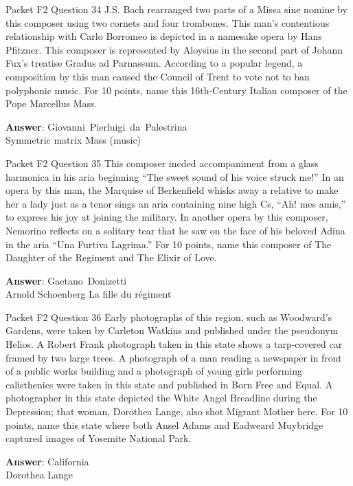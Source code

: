 \begin{frame}{Packet F2 Question 34}
J.S.   Bach rearranged two parts of a Missa sine nomine by this   composer using two cornets and four trombones. This man’s contentious relationship with Carlo Borromeo is depicted in a namesake opera by Hans Pfitzner. This composer   is represented   by Aloysius in the second part of Johann Fux’s treatise Gradus   ad Parnassum. According to a popular legend, a composition by this man caused the Council of Trent   to vote not to ban polyphonic music. For 10 points, name this 16th-Century Italian composer of the Pope Marcellus Mass.

\textbf{Answer}: Giovanni\ Pierluigi\ da\ Palestrina\\
 Symmetric matrix
 Mass (music)
\end{frame}

\begin{frame}{Packet F2 Question 35}
This composer incded accompaniment from a   glass harmonica in his aria beginning “The sweet sound of his voice struck me!” In an opera by this man, the Marquise of Berkenfield whisks   away a relative to make her a lady just as a tenor sings an aria containing nine high Cs, “Ah! mes amis,” to express his   joy at joining the military. In another opera by this composer, Nemorino reflects     on a solitary tear that he saw on the face of his beloved Adina in the aria “Una   Furtiva Lagrima.” For 10 points, name this composer of The Daughter of the Regiment and The Elixir of Love.

\textbf{Answer}: Gaetano\ Donizetti\\
 Arnold Schoenberg
 La fille du régiment
\end{frame}

\begin{frame}{Packet F2 Question 36}
Early photographs of this region, such as Woodward's Gardens, were taken by Carleton Watkins and published under the pseudonym Helios. A Robert Frank photograph taken in this state shows   a tarp-covered car framed by two large trees. A photograph of a man reading a newspaper in front of a public works building and a photograph of young girls performing calisthenics were taken in this state and published in Born Free and Equal. A photographer   in this state depicted the White Angel Breadline during the Depression; that   woman, Dorothea Lange, also shot Migrant Mother here. For 10 points, name this state where both Ansel Adams and Eadweard Muybridge captured images of Yosemite National   Park.

\textbf{Answer}: California\\
 Dorothea Lange
\end{frame}

